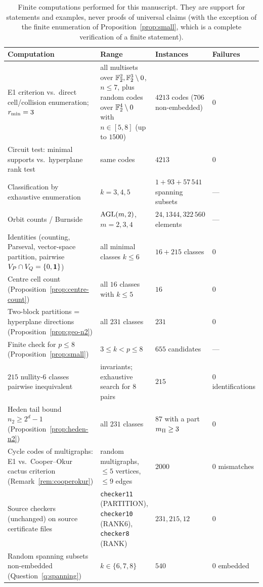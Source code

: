 \begin{table}[ht]
\centering\small
\begin{tabular}{@{}p{5.3cm}p{4.3cm}p{3.0cm}p{1.7cm}@{}}
\toprule
Computation & Range & Instances & Failures\\
\midrule
E1 criterion vs.\ direct cell/collision enumeration; $r_{\min}=3$ & all multisets over $\mathbb F_2^{2},\mathbb F_2^3\setminus0$, $n\le7$, plus random codes over $\mathbb F_2^4\setminus0$ with $n\in[5,8]$ (up to $1500$) & $4213$ codes ($706$ non-embedded) & $0$\\
Circuit test: minimal supports vs.\ hyperplane rank test & same codes & $4213$ & $0$\\
Classification by exhaustive enumeration & $k=3,4,5$ & $1+93+57\,541$ spanning subsets & ---\\
Orbit counts / Burnside & $\mathrm{AGL}(m,2)$, $m=2,3,4$ & $24,1344,322\,560$ elements & ---\\
Identities (counting, Parseval, vector-space partition, pairwise $V_P\cap V_Q=\{0,\mathbf 1\}$) & all minimal classes $k\le6$ & $16+215$ classes & $0$\\
Centre cell count (Proposition~\ref{prop:centre-count}) & all $16$ classes with $k\le5$ & $16$ & $0$\\
Two-block partitions = hyperplane directions (Proposition~\ref{prop:geo-n2}) & all $231$ classes & $231$ & $0$\\
Finite check for $p\le8$ (Proposition~\ref{prop:small}) & $3\le k<p\le8$ & $655$ candidates & ---\\
$215$ nullity-6 classes pairwise inequivalent & invariants; exhaustive search for $8$ pairs & $215$ & $0$ identifications\\
Heden tail bound $n_2\ge2^d-1$ (Proposition~\ref{prop:heden-n2}) & all $231$ classes & $87$ with a part $m_\Pi\ge3$ & $0$\\
Cycle codes of multigraphs: E1 vs.\ Cooper--Okur cactus criterion (Remark~\ref{rem:cooperokur}) & random multigraphs, $\le5$ vertices, $\le9$ edges & $2000$ & $0$ mismatches\\
Source checkers (unchanged) on source certificate files & \texttt{checker11} (PARTITION), \texttt{checker10} (RANK6), \texttt{checker8} (RANK) & $231,215,12$ & $0$\\
Random spanning subsets non-embedded (Question~\ref{q:spanning}) & $k\in\{6,7,8\}$ & $540$ & $0$ embedded\\
\bottomrule
\end{tabular}
\caption{Finite computations performed for this manuscript. They are support for statements and examples, never proofs of universal claims (with the exception of the finite enumeration of Proposition~\ref{prop:small}, which is a complete verification of a finite statement).}\label{tab:checks}
\end{table}

